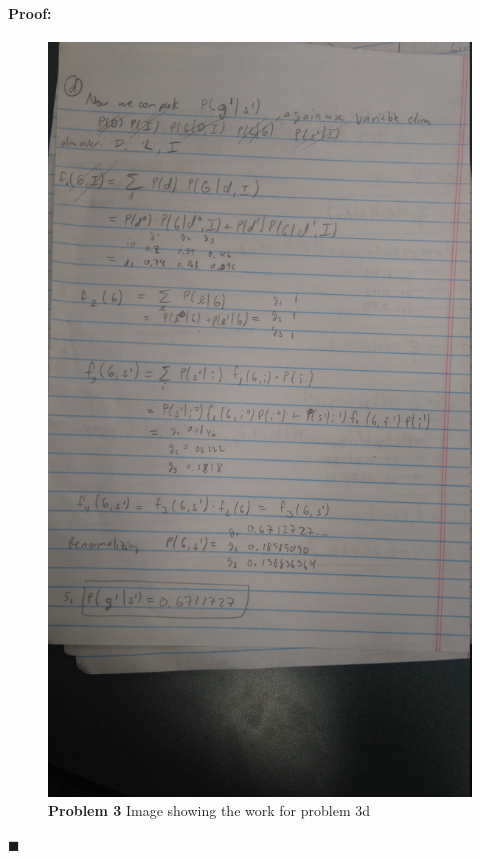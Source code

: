 \documentclass[12pt]{article}
\newenvironment{proof}{\paragraph{Proof: }}{\hfill$\blacksquare$}
\begin{document}
\begin{proof}
\begin{figure}[!htbp]
\centering
\includegraphics[width = 13cm]{hw6_3d.jpg}
\caption{\textbf{Problem 3} Image showing the work for problem 3d}
\end{figure}

\newpage


\end{proof}
\end{document}
